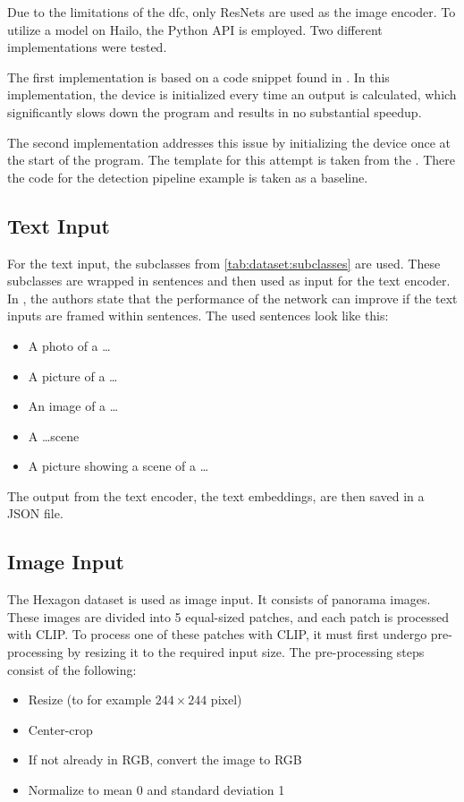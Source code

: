 Due to the limitations of the \acrshort{dfc}, only ResNets are used as the image encoder.
To utilize a model on Hailo, the Python API is employed. 
Two different implementations were tested.

The first implementation is based on a code snippet found in \cite{hailoimplementation}.
In this implementation, the device is initialized every time an output is calculated, which significantly slows down the program and results in no substantial speedup.

The second implementation addresses this issue by initializing the device once at the start of the program. 
The template for this attempt is taken from the \cite{hailo_application_code_examples}.
There the code for the detection pipeline example is taken as a baseline.

\subsection{Text Input}

For the text input, the subclasses from \cref{tab:dataset:subclasses} are used. 
These subclasses are wrapped in sentences and then used as input for the text encoder.
In \cite{clip}, the authors state that the performance of the network can improve if the text inputs are framed within sentences.
The used sentences look like this:
\begin{itemize}
    \item A photo of a \dots
    \item A picture of a \dots
    \item An image of a \dots
    \item A \dots scene
    \item A picture showing a scene of a \dots
\end{itemize}
The output from the text encoder, the text embeddings, are then saved in a JSON file.

\subsection{Image Input}
The Hexagon dataset is used as image input.
It consists of panorama images. 
These images are divided into 5 equal-sized patches, and each patch is processed with CLIP.
To process one of these patches with CLIP, it must first undergo pre-processing by resizing it to the required input size.
The pre-processing steps consist of the following:

\begin{itemize}
    \item Resize (to for example \(244 \times 244\) pixel)
    \item Center-crop
    \item If not already in RGB, convert the image to RGB
    \item Normalize to mean 0 and standard deviation 1
\end{itemize}

